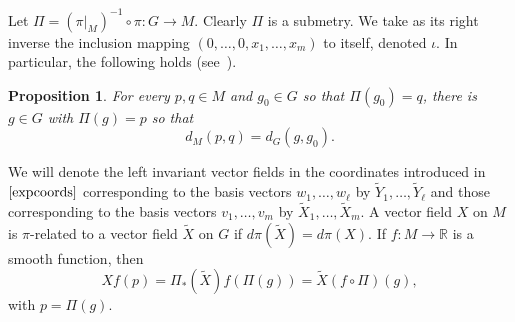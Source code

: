 \documentclass[12pt]{amsart}
\newtheorem{proposition}{Proposition}[section]
\begin{document}
Let $\Pi = (\pi\big|_M)^{-1}\circ \pi:G\to M$.
Clearly $\Pi$ is a submetry. We take as its right inverse the inclusion mapping $(0,\dots,0,x_1,\dots,x_m)$ to itself, denoted $\iota$.
In particular, the following holds (see~\cite{LeDonneBook}).
\begin{proposition}\label{submetrylift}
    For every $p,q\in M$ and $g_0\in G$ so that $\Pi(g_0)=q$, there is $g\in G$ with $\Pi(g)=p$ so that
  $$
  d_M(p,q) = d_G(g,g_0).
  $$
\end{proposition}

We will denote the left invariant vector fields in the coordinates introduced in $\eqref{expcoords}$ corresponding to the basis vectors $w_1,\dots,w_\ell$ by $\tilde Y_1,\dots,\tilde Y_\ell$ and those corresponding to the basis vectors $v_1,\dots,v_m$ by $\tilde X_1,\dots,\tilde X_m$. 
A vector field $X$ on 
$M$ is $\pi$-related to
a vector field $\tilde X$ on $G$ if  $d\pi(\tilde X)=d\pi(X)$.
If $f:M\to \mathbb R$ is a smooth function, then
 \begin{equation}\label{pushforward}
    Xf(p) = \Pi_* (\tilde X)f(\Pi(g)) = \tilde X (f\circ \Pi)(g),
\end{equation}
 with $p=\Pi(g)$.


\end{document}
